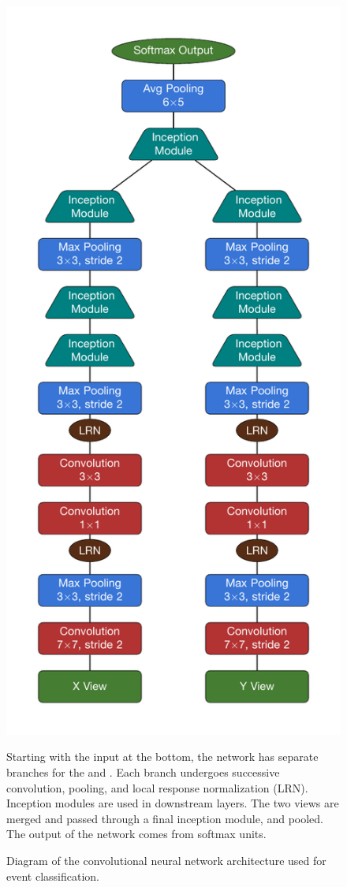 \begin{figure}[t]
\begin{center}
\includegraphics[height=0.8\textheight]{figures/arch/arch.pdf}
\end{center}
\caption{Diagram of the convolutional neural network architecture used
for event classification.}{Starting with the input at the bottom,
the network has separate branches for the \xview and \yview.
Each branch undergoes successive convolution, pooling, and
local response normalization (LRN).  Inception modules are used in downstream layers.
The two views are merged and passed through a final inception module, and
pooled.  The output of the network comes from softmax units.
}
\label{arch}
\end{figure}


